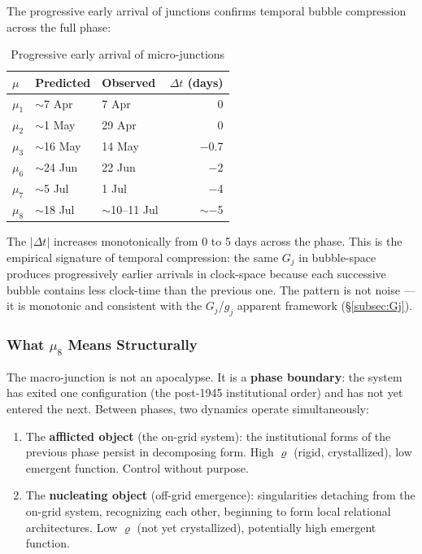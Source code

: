 \documentclass[12pt,a4paper]{article}
\newcommand{\gj}{g_j}
\begin{document}
The progressive early arrival of junctions confirms temporal bubble compression across the full phase:

\begin{table}[H]
\centering
\caption{Progressive early arrival of micro-junctions}
\label{tab:compression}
\begin{tabular}{@{}lllr@{}}
\toprule
$\mu$ & \textbf{Predicted} & \textbf{Observed} & $\Delta t$ \textbf{(days)} \\
\midrule
$\mu_1$ & $\sim$7 Apr & 7 Apr & 0 \\
$\mu_2$ & $\sim$1 May & 29 Apr & 0 \\
$\mu_3$ & $\sim$16 May & 14 May & $-$0.7 \\
$\mu_6$ & $\sim$24 Jun & 22 Jun & $-$2 \\
$\mu_7$ & $\sim$5 Jul & 1 Jul & $-$4 \\
$\mu_8$ & $\sim$18 Jul & $\sim$10--11 Jul & $\sim$$-$5 \\
\bottomrule
\end{tabular}
\end{table}

The $|\Delta t|$ increases monotonically from 0 to 5 days across the phase. This is the empirical signature of temporal compression: the same $G_j$ in bubble-space produces progressively earlier arrivals in clock-space because each successive bubble contains less clock-time than the previous one. The pattern is not noise --- it is monotonic and consistent with the $G_j$/$\gj$ apparent framework (\S\ref{subsec:Gj}).

\subsubsection{What $\mu_8$ Means Structurally}

The macro-junction is not an apocalypse. It is a \textbf{phase boundary}: the system has exited one configuration (the post-1945 institutional order) and has not yet entered the next. Between phases, two dynamics operate simultaneously:

\begin{enumerate}[leftmargin=2em]
    \item The \textbf{afflicted object} (the on-grid system): the institutional forms of the previous phase persist in decomposing form. High $\varrho$ (rigid, crystallized), low emergent function. Control without purpose.
    \item The \textbf{nucleating object} (off-grid emergence): singularities detaching from the on-grid system, recognizing each other, beginning to form local relational architectures. Low $\varrho$ (not yet crystallized), potentially high emergent function.
\end{enumerate}
\end{document}
